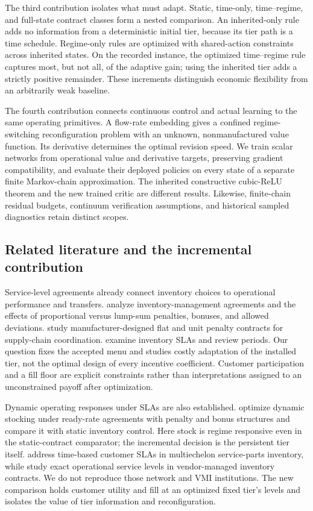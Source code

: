 \documentclass[11pt,letterpaper]{article}
\theoremstyle{definition}
\newcommand{\1}{\mathbf 1}
\begin{document}
The third contribution isolates what must adapt. Static, time-only, time--regime, and full-state contract classes form a nested comparison. An inherited-only rule adds no information from a deterministic initial tier, because its tier path is a time schedule. Regime-only rules are optimized with shared-action constraints across inherited states. On the recorded instance, the optimized time--regime rule captures most, but not all, of the adaptive gain; using the inherited tier adds a strictly positive remainder. These increments distinguish economic flexibility from an arbitrarily weak baseline.

The fourth contribution connects continuous control and actual learning to the same operating primitives. A flow-rate embedding gives a confined regime-switching reconfiguration problem with an unknown, nonmanufactured value function. Its derivative determines the optimal revision speed. We train scalar networks from operational value and derivative targets, preserving gradient compatibility, and evaluate their deployed policies on every state of a separate finite Markov-chain approximation. The inherited constructive cubic-ReLU theorem and the new trained critic are different results. Likewise, finite-chain residual budgets, continuum verification assumptions, and historical sampled diagnostics retain distinct scopes.

\subsection{Related literature and the incremental contribution}
Service-level agreements already connect inventory choices to operational performance and transfers. \citet{LiangAtkins2013} analyze inventory-management agreements and the effects of proportional versus lump-sum penalties, bonuses, and allowed deviations. \citet{Sieke2012} study manufacturer-designed flat and unit penalty contracts for supply-chain coordination. \citet{Katok2008} examine inventory SLAs and review periods. Our question fixes the accepted menu and studies costly adaptation of the installed tier, not the optimal design of every incentive coefficient. Customer participation and a fill floor are explicit constraints rather than interpretations assigned to an unconstrained payoff after optimization.

Dynamic operating responses under SLAs are also established. \citet{Hosseinifard2022} optimize dynamic stocking under ready-rate agreements with penalty and bonus structures and compare it with static inventory control. Here stock is regime responsive even in the static-contract comparator; the incremental decision is the persistent tier itself. \citet{Caggiano2007} address time-based customer SLAs in multiechelon service-parts inventory, while \citet{Abbasi2022} study exact operational service levels in vendor-managed inventory contracts. We do not reproduce those network and VMI institutions. The new comparison holds customer utility and fill at an optimized fixed tier's levels and isolates the value of tier information and reconfiguration.
\end{document}
